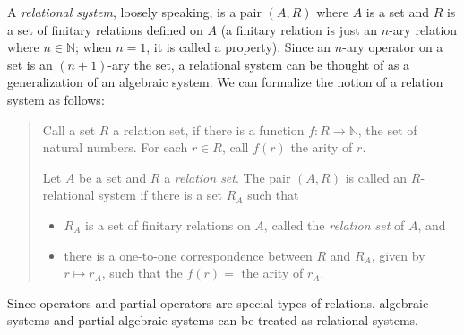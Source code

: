 \documentclass[12pt]{article}
\begin{document}
A \emph{relational system}, loosely speaking, is a pair $(A,R)$ where $A$ is a set and $R$ is a set of finitary relations defined on $A$ (a finitary relation is just an $n$-ary relation where $n\in\mathbb{N}$; when $n=1$, it is called a property).  Since an $n$-ary operator on a set is an $(n+1)$-ary  the set, a relational system can be thought of as a generalization of an algebraic system.  We can formalize the notion of a relation system as follows:
\begin{quote}
Call a set $R$ a relation set, if there is a function $f:R\to \mathbb{N}$, the set of natural numbers.  For each $r\in R$, call $f(r)$ the arity of $r$.

Let $A$ be a set and $R$ a \emph{relation set}.  The pair $(A,R)$ is called an $R$-relational system if there is a set $R_A$ such that
\begin{itemize}
\item $R_A$ is a set of finitary relations on $A$, called the \emph{relation set} of $A$, and
\item there is a one-to-one correspondence between $R$ and $R_A$, given by $r \mapsto r_A$, such that the $f(r)=$ the arity of $r_A$.
\end{itemize}
\end{quote}

Since operators and partial operators are special types of relations.  algebraic systems and partial algebraic systems can be treated as relational systems.
\end{document}
